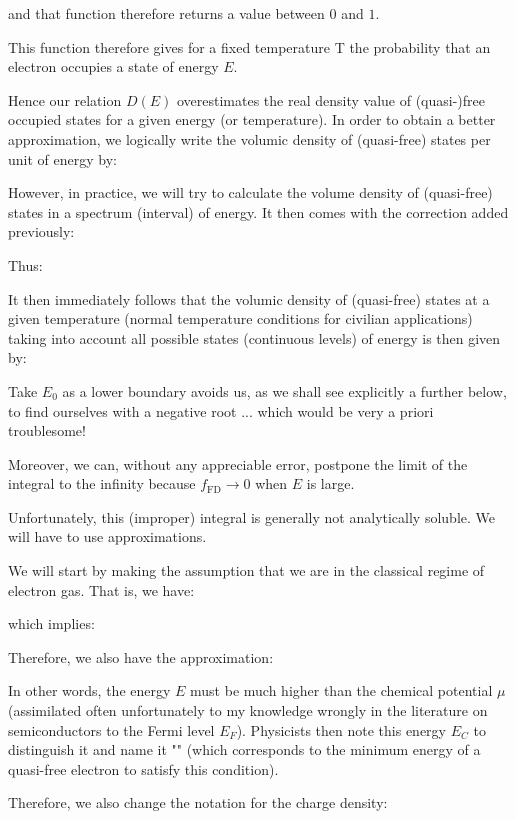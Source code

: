 	and that function therefore returns a value between $0$ and $1$.

This function therefore gives for a fixed temperature T the probability that an electron occupies a state of energy $E$.

Hence our relation $D(E)$ overestimates the real density value of (quasi-)free occupied states for a given energy (or temperature). In order to obtain a better approximation, we logically write the volumic density of (quasi-free) states per unit of energy by:
	
	However, in practice, we will try to calculate the volume density of (quasi-free) states in a spectrum (interval) of energy. It then comes with the correction added previously:
	
	Thus:
	
	It then immediately follows that the volumic density of (quasi-free) states at a given temperature (normal temperature conditions for civilian applications) taking into account all possible states (continuous levels) of energy is then given by:
	
	Take $E_0$ as a lower boundary avoids us, as we shall see explicitly a further below, to find ourselves with a negative root ... which would be very a priori troublesome!

	Moreover, we can, without any appreciable error, postpone the limit of the integral to the infinity because $f_{\text{FD}}\rightarrow 0$ when $E$ is large.

	Unfortunately, this (improper) integral is generally not analytically soluble. We will have to use approximations.

	We will start by making the assumption that we are in the classical regime of electron gas. That is, we have:
	
	which implies:
	
	Therefore, we also have the approximation:
	
	In other words, the energy $E$ must be much higher than the chemical potential $\mu$ (assimilated often unfortunately to my knowledge wrongly in the literature on semiconductors to the Fermi level $E_F$). Physicists then note this energy $E_C$ to distinguish it and name it "" (which corresponds to the minimum energy of a quasi-free electron to satisfy this condition).

	Therefore, we also change the notation for the charge density:
	
